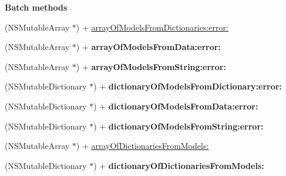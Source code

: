 \begin{Indent}\textbf{ Batch methods}\par
\begin{DoxyCompactItemize}
\item 
(N\+S\+Mutable\+Array $\ast$) + \mbox{\hyperlink{interface_o_p_t_l_y_j_s_o_n_model_aa02b3f8f701603689c9a3c4aeb4b8763}{array\+Of\+Models\+From\+Dictionaries\+:error\+:}}
\item 
\mbox{\label{interface_o_p_t_l_y_j_s_o_n_model_a97dba2cf17f890951ffe4d6eed4eeb46}} 
(N\+S\+Mutable\+Array $\ast$) + {\bfseries array\+Of\+Models\+From\+Data\+:error\+:}
\item 
\mbox{\label{interface_o_p_t_l_y_j_s_o_n_model_a1a254997ddecf8db74c664b53c8ce544}} 
(N\+S\+Mutable\+Array $\ast$) + {\bfseries array\+Of\+Models\+From\+String\+:error\+:}
\item 
\mbox{\label{interface_o_p_t_l_y_j_s_o_n_model_aa04b799da39b43e2ed117fd8fcf9d2e1}} 
(N\+S\+Mutable\+Dictionary $\ast$) + {\bfseries dictionary\+Of\+Models\+From\+Dictionary\+:error\+:}
\item 
\mbox{\label{interface_o_p_t_l_y_j_s_o_n_model_a952e7b9a00a930c887cd8f2794269e0e}} 
(N\+S\+Mutable\+Dictionary $\ast$) + {\bfseries dictionary\+Of\+Models\+From\+Data\+:error\+:}
\item 
\mbox{\label{interface_o_p_t_l_y_j_s_o_n_model_ad45ff075542dd910a4a7b60929fa8add}} 
(N\+S\+Mutable\+Dictionary $\ast$) + {\bfseries dictionary\+Of\+Models\+From\+String\+:error\+:}
\item 
(N\+S\+Mutable\+Array $\ast$) + \mbox{\hyperlink{interface_o_p_t_l_y_j_s_o_n_model_a6094627ef7b6ea29638aa744cf529090}{array\+Of\+Dictionaries\+From\+Models\+:}}
\item 
\mbox{\label{interface_o_p_t_l_y_j_s_o_n_model_a620bc19b72f467bfb996b1ac8b0ece66}} 
(N\+S\+Mutable\+Dictionary $\ast$) + {\bfseries dictionary\+Of\+Dictionaries\+From\+Models\+:}
\end{DoxyCompactItemize}
\end{Indent}
